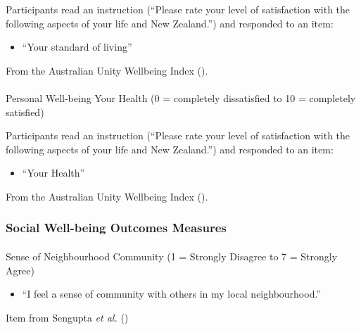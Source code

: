 \documentclass[
  single column]{article}
\makeatletter
\let\oldparagraph\paragraph
\renewcommand{\paragraph}{
    \@ifstar
      \xxxParagraphStar
      \xxxParagraphNoStar
  }
\newcommand{\xxxParagraphStar}[1]{\oldparagraph*{#1}\mbox{}}
\newcommand{\xxxParagraphNoStar}[1]{\oldparagraph{#1}\mbox{}}
\providecommand{\tightlist}{%
  \setlength{\itemsep}{0pt}\setlength{\parskip}{0pt}}\usepackage{longtable,booktabs,array}
\makeatother
\begin{document}
Participants read an instruction (``Please rate your level of
satisfaction with the following aspects of your life and New Zealand.'')
and responded to an item:

\begin{itemize}
\tightlist
\item
  ``Your standard of living''
\end{itemize}

From the Australian Unity Wellbeing Index
().

\paragraph{Personal Well-being Your Health (0 = completely dissatisfied
to 10 = completely
satisfied)}\label{personal-well-being-your-health-0-completely-dissatisfied-to-10-completely-satisfied}

Participants read an instruction (``Please rate your level of
satisfaction with the following aspects of your life and New Zealand.'')
and responded to an item:

\begin{itemize}
\tightlist
\item
  ``Your Health''
\end{itemize}

From the Australian Unity Wellbeing Index
().

\subsubsection{Social Well-being Outcomes
Measures}\label{social-well-being-outcomes-measures}

\paragraph{Sense of Neighbourhood Community (1 = Strongly Disagree to 7
= Strongly
Agree)}\label{sense-of-neighbourhood-community-1-strongly-disagree-to-7-strongly-agree}

\begin{itemize}
\tightlist
\item
  ``I feel a sense of community with others in my local neighbourhood.''
\end{itemize}

Item from Sengupta \emph{et al.} ()
\end{document}

